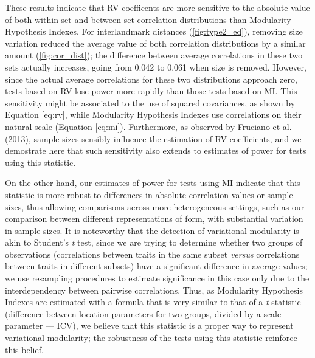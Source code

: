 \documentclass[12pt,twoside]{report}
\begin{document}
These results indicate that RV coefficents are more sensitive to the
absolute value of both within-set and between-set correlation
distributions than Modularity Hypothesis Indexes. For interlandmark
distances (\autoref{fig:type2_ed}), removing size variation reduced the
average value of both correlation distributions by a similar amount
(\autoref{fig:cor_dist}); the difference between average correlations in
these two sets actually increases, going from 0.042 to 0.061 when size
is removed. However, since the actual average correlations for these two
distributions approach zero, tests based on RV lose power more rapidly
than those tests based on MI. This sensitivity might be associated to
the use of squared covariances, as shown by Equation \ref{eq:rv}, while
Modularity Hypothesis Indexes use correlations on their natural scale
(Equation \ref{eq:mi}). Furthermore, as observed by Fruciano et al.
(2013), sample sizes sensibly influence the estimation of RV
coefficients, and we demostrate here that such sensitivity also extends
to estimates of power for tests using this statistic.

On the other hand, our estimates of power for tests using MI indicate
that this statistic is more robust to differences in absolute
correlation values or sample sizes, thus allowing comparisons across
more heterogeneous settings, such as our comparison between different
representations of form, with substantial variation in sample sizes. It
is noteworthy that the detection of variational modularity is akin to
Student's \emph{t} test, since we are trying to determine whether two
groups of observations (correlations between traits in the same subset
\emph{versus} correlations between traits in different subsets) have a
significant difference in average values; we use resampling procedures
to estimate significance in this case only due to the interdependency
between pairwise correlations. Thus, as Modularity Hypothesis Indexes
are estimated with a formula that is very similar to that of a \emph{t}
statistic (difference between location parameters for two groups,
divided by a scale parameter --- ICV), we believe that this statistic is
a proper way to represent variational modularity; the robustness of the
tests using this statistic reinforce this belief.
\end{document}
